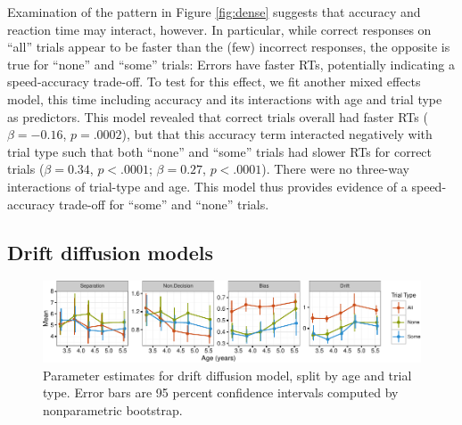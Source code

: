\documentclass[10pt, letterpaper]{article}
\newenvironment{CodeChunk}{}{}
\begin{document}
Examination of the pattern in Figure \ref{fig:dense} suggests that
accuracy and reaction time may interact, however. In particular, while
correct responses on ``all'' trials appear to be faster than the (few)
incorrect responses, the opposite is true for ``none'' and ``some''
trials: Errors have faster RTs, potentially indicating a speed-accuracy
trade-off. To test for this effect, we fit another mixed effects model,
this time including accuracy and its interactions with age and trial
type as predictors. This model revealed that correct trials overall had
faster RTs (\(\beta = -0.16\), \(p = .0002\)), but that this accuracy
term interacted negatively with trial type such that both ``none'' and
``some'' trials had slower RTs for correct trials (\(\beta = 0.34\),
\(p < .0001\); \(\beta = 0.27\), \(p < .0001\)). There were no three-way
interactions of trial-type and age. This model thus provides evidence of
a speed-accuracy trade-off for ``some'' and ``none'' trials.

\subsection{Drift diffusion models}\label{drift-diffusion-models}

\begin{CodeChunk}
\begin{figure}[t]

{\centering \includegraphics{figs/devo_param_plot-1} 

}

\caption[Parameter estimates for drift diffusion model, split by age and trial type]{Parameter estimates for drift diffusion model, split by age and trial type. Error bars are 95 percent confidence intervals computed by nonparametric bootstrap.}\label{fig:devo_param_plot}
\end{figure}
\end{CodeChunk}
\end{document}
